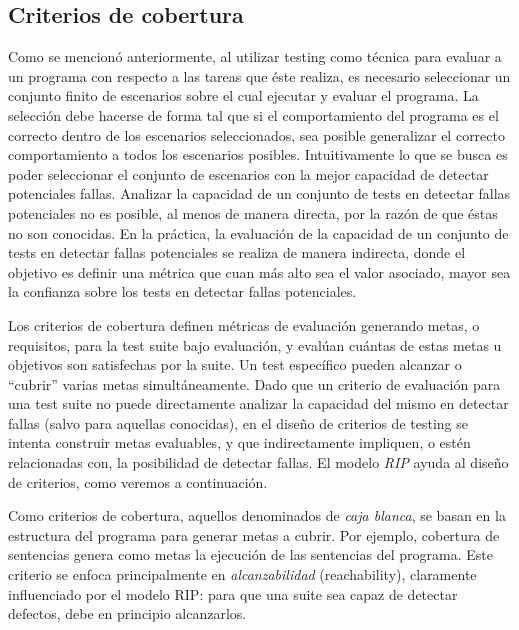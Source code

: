 \subsection{Criterios de cobertura}
\label{sec:preliminares.testing.covcriteria}


Como se mencion\'o anteriormente, al utilizar testing como t\'ecnica para evaluar a un programa con respecto a las tareas que \'este realiza, es necesario seleccionar un conjunto finito de escenarios sobre el cual ejecutar y evaluar el programa. La selecci\'on debe hacerse de forma tal que si el comportamiento del programa es el correcto dentro de los escenarios seleccionados, sea posible generalizar el correcto comportamiento a todos los escenarios posibles. Intuitivamente lo que se busca es poder seleccionar el conjunto de escenarios con la mejor capacidad de detectar potenciales fallas.
Analizar la capacidad de un conjunto de tests en detectar fallas potenciales no es posible, al menos de manera directa, por la raz\'on de que \'estas no son conocidas. En la pr\'actica, la evaluaci\'on de la capacidad de un conjunto de tests en detectar fallas potenciales se realiza de manera indirecta, donde el objetivo es definir una m\'etrica que cuan m\'as alto sea el valor asociado, mayor sea la confianza sobre los tests en detectar fallas potenciales.

Los criterios de cobertura definen m\'etricas de evaluaci\'on generando metas, o requisitos, para la test suite bajo evaluaci\'on, y eval\'uan cu\'antas de estas metas u objetivos son satisfechas por la suite. Un test espec\'ifico pueden alcanzar o ``cubrir'' varias metas simult\'aneamente. Dado que un criterio de evaluaci\'on para una test suite no puede directamente analizar la capacidad del mismo en detectar fallas (salvo para aquellas conocidas), en el dise\~no de criterios de testing se intenta construir metas evaluables, y que indirectamente impliquen, o est\'en relacionadas con, la posibilidad de detectar fallas. El modelo \emph{RIP} ayuda al dise\~no de criterios, como veremos a continuaci\'on.

Como criterios de cobertura, aquellos denominados de \emph{caja blanca}, se basan en la estructura del programa para generar metas a cubrir. Por ejemplo, cobertura de sentencias genera como metas la ejecuci\'on de las sentencias del programa. Este criterio se enfoca principalmente en \emph{alcanzabilidad} (reachability), claramente influenciado por el modelo RIP: para que una suite sea capaz de detectar defectos, debe en principio alcanzarlos. 

